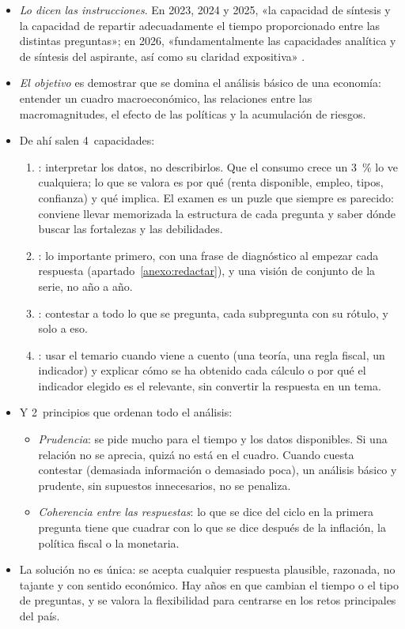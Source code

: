 \documentclass[11pt]{article}
\begin{document}
\begin{itemize}
\item \emph{Lo dicen las instrucciones}. En 2023, 2024 y 2025, «la capacidad de síntesis y la capacidad de repartir adecuadamente el tiempo proporcionado entre las distintas preguntas»; en 2026, «fundamentalmente las capacidades analítica y de síntesis del aspirante, así como su claridad expositiva» \parencite{ATCEE2026Examenes}.
\item \emph{El objetivo} es demostrar que se domina el análisis básico de una economía: entender un cuadro macroeconómico, las relaciones entre las macromagnitudes, el efecto de las políticas y la acumulación de riesgos.
\item De ahí salen 4~capacidades:
  \begin{enumerate}
  \item {}: interpretar los datos, no describirlos. Que el consumo crece un 3~\% lo ve cualquiera; lo que se valora es por qué (renta disponible, empleo, tipos, confianza) y qué implica. El examen es un puzle que siempre es parecido: conviene llevar memorizada la estructura de cada pregunta y saber dónde buscar las fortalezas y las debilidades.
  \item {}: lo importante primero, con una frase de diagnóstico al empezar cada respuesta (apartado~\ref{anexo:redactar}), y una visión de conjunto de la serie, no año a año.
  \item {}: contestar a todo lo que se pregunta, cada subpregunta con su rótulo, y solo a eso.
  \item {}: usar el temario cuando viene a cuento (una teoría, una regla fiscal, un indicador) y explicar cómo se ha obtenido cada cálculo o por qué el indicador elegido es el relevante, sin convertir la respuesta en un tema.
  \end{enumerate}
\item Y 2~principios que ordenan todo el análisis:
  \begin{itemize}
  \item \emph{Prudencia}: se pide mucho para el tiempo y los datos disponibles. Si una relación no se aprecia, quizá no está en el cuadro. Cuando cuesta contestar (demasiada información o demasiado poca), un análisis básico y prudente, sin supuestos innecesarios, no se penaliza.
  \item \emph{Coherencia entre las respuestas}: lo que se dice del ciclo en la primera pregunta tiene que cuadrar con lo que se dice después de la inflación, la política fiscal o la monetaria.
  \end{itemize}
\item La solución no es única: se acepta cualquier respuesta plausible, razonada, no tajante y con sentido económico. Hay años en que cambian el tiempo o el tipo de preguntas, y se valora la flexibilidad para centrarse en los retos principales del país.
\end{itemize}
\end{document}
